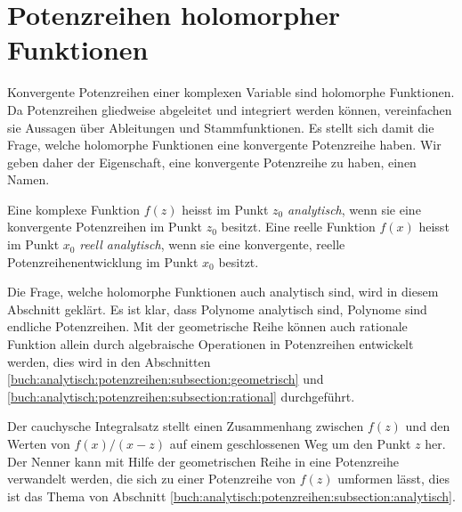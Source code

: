 %
%
%
\section{Potenzreihen holomorpher Funktionen
\label{buch:analytisch:section:potenzreihen}}
Konvergente Potenzreihen einer komplexen Variable sind holomorphe
Funktionen.
Da Potenzreihen gliedweise abgeleitet und integriert werden können,
vereinfachen sie Aussagen über Ableitungen und Stammfunktionen.
Es stellt sich damit die Frage, welche holomorphe Funktionen
eine konvergente Potenzreihe haben.
Wir geben daher der Eigenschaft, eine konvergente Potenzreihe zu haben,
einen Namen.

\begin{definition}[analytisch]
Eine komplexe Funktion $f(z)$ heisst im Punkt $z_0$ \emph{analytisch},
wenn sie eine konvergente Potenzreihen im Punkt $z_0$ besitzt.
%
Eine reelle Funktion $f(x)$ heisst im Punkt $x_0$ \emph{reell analytisch},
wenn sie eine konvergente, reelle Potenzreihenentwicklung im Punkt $x_0$
besitzt.
%
\end{definition}

Die Frage, welche holomorphe Funktionen auch analytisch sind, wird
in diesem Abschnitt geklärt.
Es ist klar, dass Polynome analytisch sind, Polynome sind endliche 
Potenzreihen.
Mit der geometrische Reihe können auch rationale Funktion allein durch
algebraische Operationen in Potenzreihen entwickelt werden, dies wird
in den Abschnitten 
\ref{buch:analytisch:potenzreihen:subsection:geometrisch}
und
\ref{buch:analytisch:potenzreihen:subsection:rational}
durchgeführt.

Der cauchysche Integralsatz stellt einen Zusammenhang zwischen $f(z)$
und den Werten von $f(x)/(x-z)$ auf einem geschlossenen Weg um den
Punkt $z$ her.
Der Nenner kann mit Hilfe der geometrischen Reihe in eine Potenzreihe
verwandelt werden, die sich zu einer Potenzreihe von $f(z)$ umformen
lässt, dies ist das Thema von Abschnitt
\ref{buch:analytisch:potenzreihen:subsection:analytisch}.







